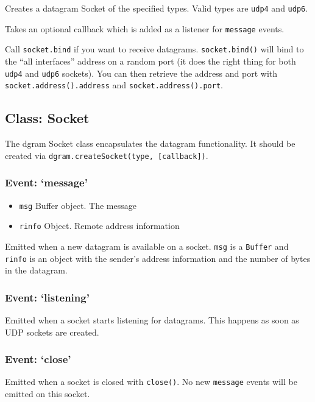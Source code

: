 Creates a datagram Socket of the specified types. Valid types are
\texttt{udp4} and \texttt{udp6}.

Takes an optional callback which is added as a listener for
\texttt{message} events.

Call \texttt{socket.bind} if you want to receive datagrams.
\texttt{socket.bind()} will bind to the ``all interfaces'' address on a
random port (it does the right thing for both \texttt{udp4} and
\texttt{udp6} sockets). You can then retrieve the address and port with
\texttt{socket.address().address} and \texttt{socket.address().port}.

\subsection{Class: Socket}

The dgram Socket class encapsulates the datagram functionality. It
should be created via \texttt{dgram.createSocket(type, {[}callback{]})}.

\subsubsection{Event: `message'}

\begin{itemize}
\item
  \texttt{msg} Buffer object. The message
\item
  \texttt{rinfo} Object. Remote address information
\end{itemize}

Emitted when a new datagram is available on a socket. \texttt{msg} is a
\texttt{Buffer} and \texttt{rinfo} is an object with the sender's
address information and the number of bytes in the datagram.

\subsubsection{Event: `listening'}

Emitted when a socket starts listening for datagrams. This happens as
soon as UDP sockets are created.

\subsubsection{Event: `close'}

Emitted when a socket is closed with \texttt{close()}. No new
\texttt{message} events will be emitted on this socket.

